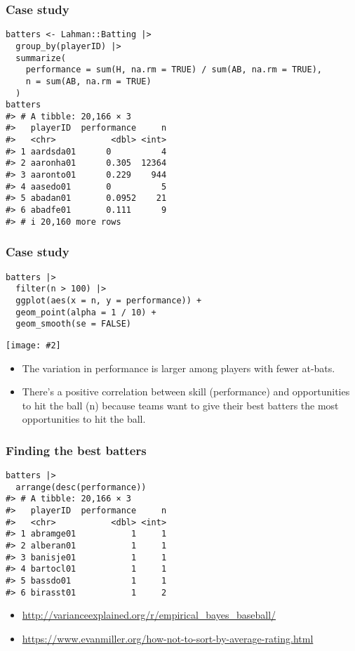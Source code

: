 \documentclass{beamer}
\newcommand{\bi}{\begin{itemize}}
\newcommand{\li}{\item}
\newcommand{\ei}{\end{itemize}}
\newcommand{\fig}[2]{\centerline{\texttt{[image: \#2]}}}
\newcommand{\bfr}[1]{\begin{frame}[fragile]\frametitle{{ #1 }}}
\begin{document}
\bfr{Case study}\scriptsize
\begin{verbatim}
batters <- Lahman::Batting |> 
  group_by(playerID) |> 
  summarize(
    performance = sum(H, na.rm = TRUE) / sum(AB, na.rm = TRUE),
    n = sum(AB, na.rm = TRUE)
  )
batters
#> # A tibble: 20,166 × 3
#>   playerID  performance     n
#>   <chr>           <dbl> <int>
#> 1 aardsda01      0          4
#> 2 aaronha01      0.305  12364
#> 3 aaronto01      0.229    944
#> 4 aasedo01       0          5
#> 5 abadan01       0.0952    21
#> 6 abadfe01       0.111      9
#> # i 20,160 more rows
\end{verbatim}
\end{frame}


\bfr{Case study}\scriptsize
\begin{verbatim}
batters |> 
  filter(n > 100) |> 
  ggplot(aes(x = n, y = performance)) +
  geom_point(alpha = 1 / 10) + 
  geom_smooth(se = FALSE)
\end{verbatim}
\fig{0.6}{unnamed-chunk-58-1.png}
\bi
\li The variation in performance is larger among players with fewer at-bats.
\li
There’s a positive correlation between skill (performance) and opportunities to hit the ball (n) because teams want to give their best batters the most opportunities to hit the ball.
\ei
\end{frame}

\bfr{Finding the best batters}
{\scriptsize
\begin{verbatim}
batters |> 
  arrange(desc(performance))
#> # A tibble: 20,166 × 3
#>   playerID  performance     n
#>   <chr>           <dbl> <int>
#> 1 abramge01           1     1
#> 2 alberan01           1     1
#> 3 banisje01           1     1
#> 4 bartocl01           1     1
#> 5 bassdo01            1     1
#> 6 birasst01           1     2
\end{verbatim}
}
\bi
\li \url{http://varianceexplained.org/r/empirical_bayes_baseball/}
\li \url{https://www.evanmiller.org/how-not-to-sort-by-average-rating.html}
\ei
\end{frame}
\end{document}
